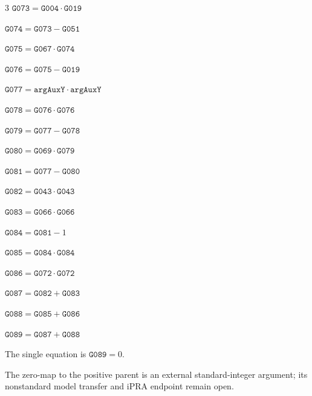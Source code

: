 \documentclass[10pt]{article}
\begin{document}
\begin{multicols}{3}
\noindent $\mathtt{G073}=\mathtt{G004}\cdot \mathtt{G019}$\par
\noindent $\mathtt{G074}=\mathtt{G073}-\mathtt{G051}$\par
\noindent $\mathtt{G075}=\mathtt{G067}\cdot \mathtt{G074}$\par
\noindent $\mathtt{G076}=\mathtt{G075}-\mathtt{G019}$\par
\noindent $\mathtt{G077}=\mathtt{argAuxY}\cdot \mathtt{argAuxY}$\par
\noindent $\mathtt{G078}=\mathtt{G076}\cdot \mathtt{G076}$\par
\noindent $\mathtt{G079}=\mathtt{G077}-\mathtt{G078}$\par
\noindent $\mathtt{G080}=\mathtt{G069}\cdot \mathtt{G079}$\par
\noindent $\mathtt{G081}=\mathtt{G077}-\mathtt{G080}$\par
\noindent $\mathtt{G082}=\mathtt{G043}\cdot \mathtt{G043}$\par
\noindent $\mathtt{G083}=\mathtt{G066}\cdot \mathtt{G066}$\par
\noindent $\mathtt{G084}=\mathtt{G081}-1$\par
\noindent $\mathtt{G085}=\mathtt{G084}\cdot \mathtt{G084}$\par
\noindent $\mathtt{G086}=\mathtt{G072}\cdot \mathtt{G072}$\par
\noindent $\mathtt{G087}=\mathtt{G082}+\mathtt{G083}$\par
\noindent $\mathtt{G088}=\mathtt{G085}+\mathtt{G086}$\par
\noindent $\mathtt{G089}=\mathtt{G087}+\mathtt{G088}$\par
\end{multicols}
The single equation is $\boxed{\mathtt{G089}=0}$.
\par\small The zero-map to the positive parent is an external standard-integer argument; its nonstandard model transfer and iPRA endpoint remain open.
\end{document}
